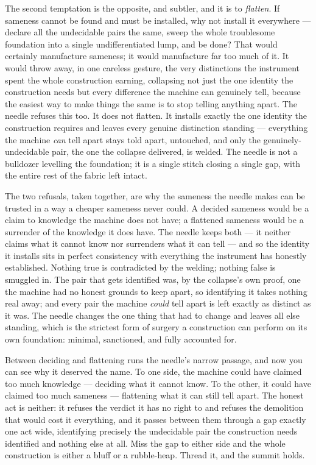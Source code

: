 The second temptation is the opposite, and subtler, and it is to \emph{flatten}. If sameness cannot be found and
must be installed, why not install it everywhere --- declare all the undecidable pairs the same, sweep the whole
troublesome foundation into a single undifferentiated lump, and be done? That would certainly manufacture
sameness; it would manufacture far too much of it. It would throw away, in one careless gesture, the very
distinctions the instrument spent the whole construction earning, collapsing not just the one identity the construction
needs but every difference the machine can genuinely tell, because the easiest way to make things the same is to
stop telling anything apart. The needle refuses this too. It does not flatten. It installs exactly the one
identity the construction requires and leaves every genuine distinction standing --- everything the machine
\emph{can} tell apart stays told apart, untouched, and only the genuinely-undecidable pair, the one the collapse
delivered, is welded. The needle is not a bulldozer levelling the foundation; it is a single stitch closing a
single gap, with the entire rest of the fabric left intact.

The two refusals, taken together, are why the sameness the needle makes can be trusted in a way a cheaper sameness
never could. A decided sameness would be a claim to knowledge the machine does not have; a flattened sameness
would be a surrender of the knowledge it does have. The needle keeps both --- it neither claims what it cannot
know nor surrenders what it can tell --- and so the identity it installs sits in perfect consistency with
everything the instrument has honestly established. Nothing true is contradicted by the welding; nothing false is
smuggled in. The pair that gets identified was, by the collapse's own proof, one the machine had no honest grounds
to keep apart, so identifying it takes nothing real away; and every pair the machine \emph{could} tell apart is
left exactly as distinct as it was. The needle changes the one thing that had to change and leaves all else
standing, which is the strictest form of surgery a construction can perform on its own foundation: minimal,
sanctioned, and fully accounted for.

Between deciding and flattening runs the needle's narrow passage, and now you can see why it deserved the name. To
one side, the machine could have claimed too much knowledge --- deciding what it cannot know. To the other, it
could have claimed too much sameness --- flattening what it can still tell apart. The honest act is neither: it
refuses the verdict it has no right to and refuses the demolition that would cost it everything, and it passes
between them through a gap exactly one act wide, identifying precisely the undecidable pair the construction needs
identified and nothing else at all. Miss the gap to either side and the whole construction is either a bluff or a
rubble-heap. Thread it, and the summit holds.

